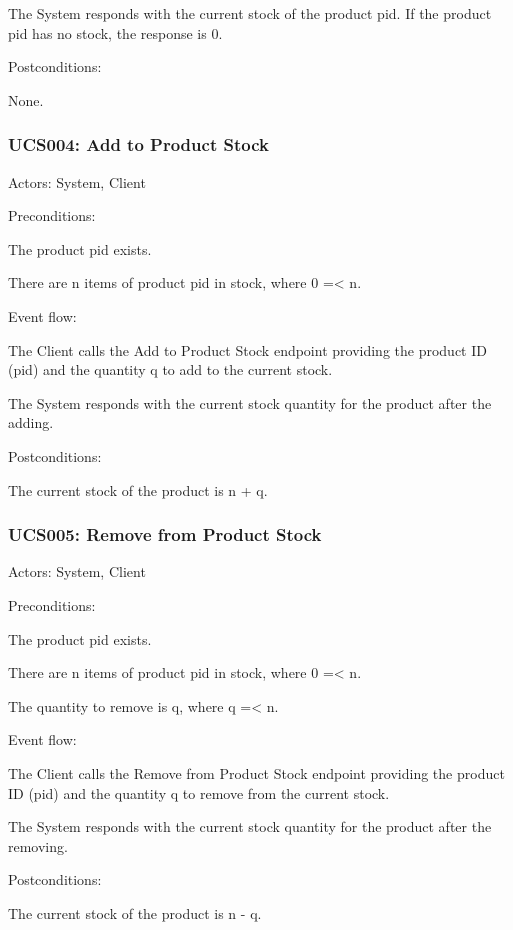 \ucitem The System responds with the current stock of the product pid. If the product pid has no stock, the response is 0.

Postconditions:

\ucitem None.

\subsubsection{UCS004: Add to Product Stock}
\label{UCS004}

Actors: System, Client

Preconditions: 

\ucitem The product pid exists.

\ucitem There are n items of product pid in stock, where 0 =< n. 

Event flow:

\ucitem The Client calls the Add to Product Stock endpoint providing the product ID (pid) and the quantity q to add to the current stock.

\ucitem The System responds with the current stock quantity for the product after the adding.

Postconditions:

\ucitem The current stock of the product is n + q.

\subsubsection{UCS005: Remove from Product Stock}
\label{UCS005}

Actors: System, Client

Preconditions: 

\ucitem The product pid exists.

\ucitem There are n items of product pid in stock, where 0 =< n.

\ucitem The quantity to remove is q, where q =< n.

Event flow:

\ucitem The Client calls the Remove from Product Stock endpoint providing the product ID (pid) and the quantity q to remove from the current stock.

\ucitem The System responds with the current stock quantity for the product after the removing.

Postconditions:

\ucitem The current stock of the product is n - q.


